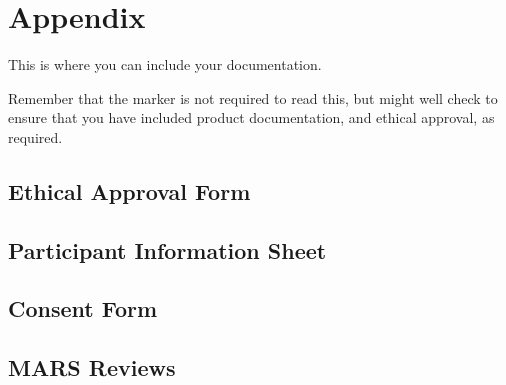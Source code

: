 \section{Appendix}

This is where you can include your documentation.

Remember that the marker is not required to read this, but might well check to ensure that you have included product documentation, and ethical approval, as required.

\subsection{Ethical Approval Form}


\subsection{Participant Information Sheet }


\subsection{Consent Form }


\subsection{MARS Reviews}








\clearpage


 

